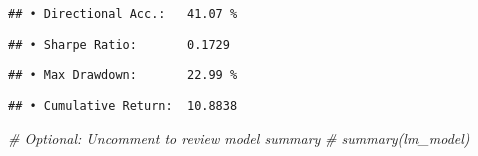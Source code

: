 \documentclass[
]{article}
\newenvironment{Shaded}{\begin{snugshade}}{\end{snugshade}}
\newcommand{\CommentTok}[1]{\textcolor[rgb]{0.56,0.35,0.01}{\textit{#1}}}
\newcommand{\DecValTok}[1]{\textcolor[rgb]{0.00,0.00,0.81}{#1}}
\newcommand{\FunctionTok}[1]{\textcolor[rgb]{0.13,0.29,0.53}{\textbf{#1}}}
\newcommand{\NormalTok}[1]{#1}
\newcommand{\SpecialCharTok}[1]{\textcolor[rgb]{0.81,0.36,0.00}{\textbf{#1}}}
\newcommand{\StringTok}[1]{\textcolor[rgb]{0.31,0.60,0.02}{#1}}
\begin{document}
\begin{verbatim}
## • Directional Acc.:   41.07 %
\end{verbatim}

\begin{Shaded}
\end{Shaded}

\begin{verbatim}
## • Sharpe Ratio:       0.1729
\end{verbatim}

\begin{Shaded}
\end{Shaded}

\begin{verbatim}
## • Max Drawdown:       22.99 %
\end{verbatim}

\begin{Shaded}
\end{Shaded}

\begin{verbatim}
## • Cumulative Return:  10.8838
\end{verbatim}

\begin{Shaded}
\begin{Highlighting}[]
\CommentTok{\# Optional: Uncomment to review model summary}
\CommentTok{\# summary(lm\_model)}
\end{Highlighting}
\end{Shaded}
\end{document}

